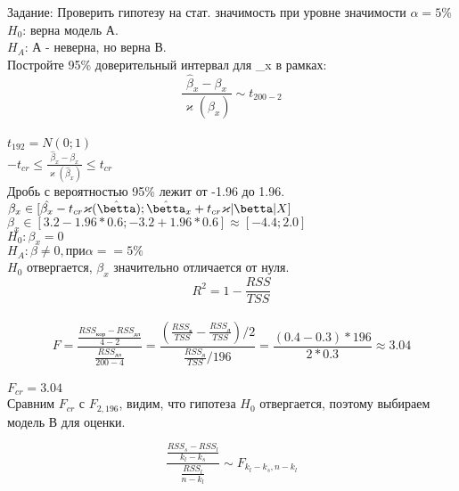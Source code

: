 \documentclass[12pt]{article} %
\theoremstyle{definition} %
\begin{document}
Задание:
Проверить гипотезу на стат. значимость при уровне значимости $\alpha = 5\% $  \\
$H_0$: верна модель А.\\
$H_A$: А - неверна, но верна В.\\

Постройте 95\% доверительный интервал для \beta_x в рамках:\\
$$\frac{\hat{\beta}_x - {\beta}_x}{\varkappa(\hat{\beta}_x)} \sim t_{200-2}$$ \\
$t_{192} = N(0;1)$\\
$-t_{cr} \leq \frac{\hat{\beta}_x - {\beta}_x}{\varkappa(\hat{\beta}_x)} \leq t_{cr} $\\
Дробь с вероятностью 95\% лежит от -1.96 до 1.96.
$\beta_x \in [\hat{\beta_x} - t_{cr} \varkappa (\hat{\betta});\hat{\betta}_x + t_{cr} \varkappa|\betta|X]$\\
$\beta_x \in [3.2 - 1.96*0.6; -3.2 + 1.96*0.6] \approx [-4.4;2.0]$\\
$H_0:\beta_x=0$\\
$H_A:\beta \neq 0, при \alpha==5\%$\\
$H_0$ отвергается, $\beta_x$ значительно отличается от нуля.\\

$$R^2=1-\frac{RSS}{TSS}$$\\

$$F=\frac{\frac{RSS_{кор}-RSS_{дл}}{4-2}}{\frac{RSS_{дл}}{200-4}}=\frac{(\frac{RSS_к}{TSS}-\frac{RSS_д}{TSS})/2}{\frac{RSS_д}{TSS}/196}=
\frac{(0.4-0.3)*196}{2*0.3} \approx 3.04$$\\
$F_{cr} = 3.04$\\
Сравним $F_{cr}$ с $F_{2,196}$, видим, что гипотеза $H_0$ отвергается, поэтому выбираем модель В для оценки.  


$$ \frac{\frac{{RSS}_s-RSS_l}{k_l-k_s}}  {\frac{RSS_l}{n-k_l}} \sim F_{k_l-k_s,n-k_l}$$
                    
                
                
\end{document}

